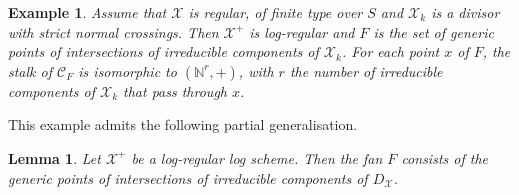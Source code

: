 \documentclass{amsart}%
\numberwithin{equation}{subsection}
\theoremstyle{plain2}
\newtheorem{lemma}[equation]{Lemma}
\theoremstyle{definition2}
\newtheorem{example}[equation]{Example}
\theoremstyle{stepstyle}
\theoremstyle{point}
\theoremstyle{subpoint}
\newcommand{\N}{\ensuremath{\mathbb{N}}}
\newcommand{\cX}{\ensuremath{\mathscr{X}}}
\begin{document}
\begin{example} \label{example kato fan regular model}
Assume that $\cX$ is regular, of finite type over $S$ and $\cX_k$ is a divisor with strict
normal crossings. Then $\cX^+$ is log-regular and $F$ is the set
of generic points of intersections of irreducible components of
$\cX_k$. For each point $x$ of $F$, the stalk of $\mathcal{C}_F$
is isomorphic to $(\N^r,+)$, with $r$ the number of irreducible
components of $\cX_k$ that pass through $x$.
\end{example}

This example admits the following partial generalisation.

\begin{lemma} \label{lemma points Kato fan}
Let $\cX^+$ be a log-regular log scheme. Then the fan $F$ consists of the generic points of intersections of irreducible components of $D_{\cX}$.
\end{lemma}
\end{document}

